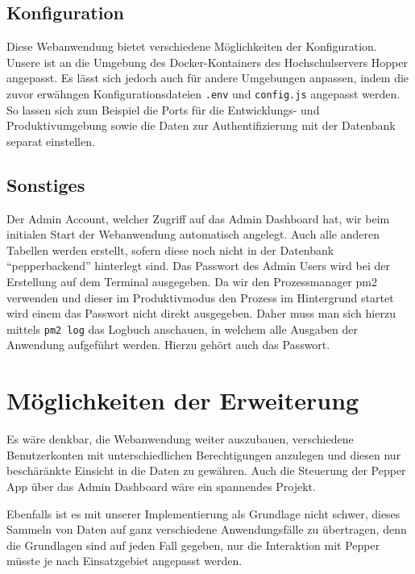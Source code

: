 \subsection*{Konfiguration}
\label{sec:nodechapter-config}
Diese Webanwendung bietet verschiedene Möglichkeiten der Konfiguration. Unsere ist an die Umgebung des Docker-Kontainers
des Hochschulservers Hopper angepasst. Es lässt sich jedoch auch für andere Umgebungen anpassen, indem die zuvor erwähngen
Konfigurationsdateien \verb|.env| und \verb|config.js| angepasst werden. So lassen sich zum Beispiel die Ports
für die Entwicklungs- und Produktivumgebung sowie die Daten zur Authentifizierung mit der Datenbank separat einstellen.


\subsection*{Sonstiges}
\label{sec:nodechapter-install-other}
Der Admin Account, welcher Zugriff auf das Admin Dashboard hat, wir beim initialen Start der Webanwendung automatisch angelegt.
Auch alle anderen Tabellen werden erstellt, sofern diese noch nicht in der Datenbank ``pepperbackend'' hinterlegt sind.
Das Passwort des Admin Users wird bei der Erstellung auf dem Terminal ausgegeben. Da wir den Prozessmanager pm2 verwenden
und dieser im Produktivmodus den Prozess im Hintergrund startet wird einem das Passwort nicht direkt ausgegeben. Daher muss
man sich hierzu mittels \verb|pm2 log| das Logbuch anschauen, in welchem alle Ausgaben der Anwendung aufgeführt werden. Hierzu
gehört auch das Passwort.


\section{Möglichkeiten der Erweiterung}

Es wäre denkbar, die Webanwendung weiter auszubauen, verschiedene Benutzerkonten mit unterschiedlichen Berechtigungen anzulegen und
diesen nur beschäränkte Einsicht in die Daten zu gewähren. Auch die Steuerung der Pepper App über das Admin Dashboard wäre
ein spannendes Projekt.

Ebenfalls ist es mit unserer Implementierung als Grundlage nicht schwer, dieses Sammeln von Daten auf ganz verschiedene Anwendungsfälle
zu übertragen, denn die Grundlagen sind auf jeden Fall gegeben, nur die Interaktion mit Pepper müsste je nach Einsatzgebiet
angepasst werden.